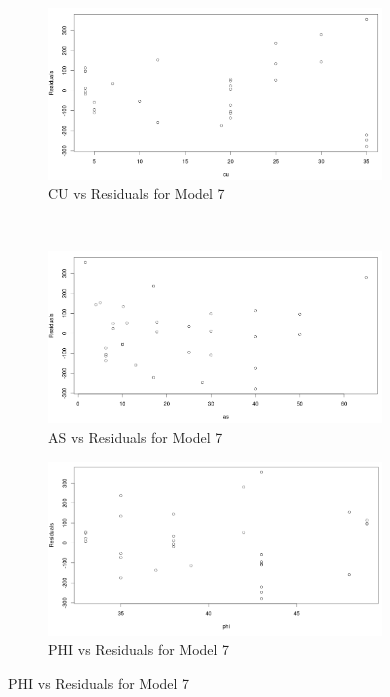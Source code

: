 \documentclass[a4paper,12pt, english]{article}
\begin{document}
\begin{figure}[H]
        \centering
        \begin{subfigure}[b]{0.85\textwidth}
                \includegraphics[width=0.96986\textwidth]{mod7-resid1}
  		\caption{CU vs Residuals for Model 7}
  		\label{fig:mod7-resid1}
        \end{subfigure}%
        ~ %
        
        \begin{subfigure}[b]{0.85\textwidth}
                \centering
  		\includegraphics[width=0.96986\textwidth]{mod7-resid2}
  		\caption{AS vs Residuals for Model 7}
  		\label{fig:mod7-resid2}
        \end{subfigure}
        
        \begin{subfigure}[b]{0.85\textwidth}
                \centering
  		\includegraphics[width=0.96986\textwidth]{mod7-resid3}
  		\caption{PHI vs Residuals for Model 7}
		  \label{fig:mod7-resid3}
        \end{subfigure}
        

\end{figure}
\end{document}
